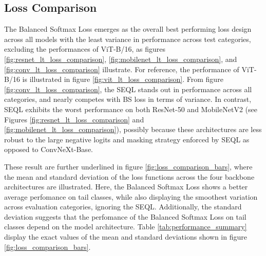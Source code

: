\subsection{Loss Comparison}
The Balanced Softmax Loss emerges as the overall best performing loss design across all models with the least variance in performance across test categories, excluding the performances of ViT-B/16, as figures \ref{fig:resnet_lt_loss_comparison}, \ref{fig:mobilenet_lt_loss_comparison}, and \ref{fig:conv_lt_loss_comparison} illustrate. For reference, the performance of ViT-B/16 is illustrated in figure \ref{fig:vit_lt_loss_comparison}. From figure \ref{fig:conv_lt_loss_comparison}, the SEQL stands out in performance across all categories, and nearly competes with BS loss in terms of variance. In contrast, SEQL exhibits the worst performance on both ResNet-50 and MobileNetV2 (see Figures \ref{fig:resnet_lt_loss_comparison} and \ref{fig:mobilenet_lt_loss_comparison}), possibly because these architectures are less robust to the large negative logits and masking strategy enforced by SEQL as opposed to ConvNeXt-Base.

These result are further underlined in figure \ref{fig:loss_comparison_bars}, where the mean and standard deviation of the loss functions across the four backbone architectures are illustrated. Here, the Balanced Softmax Loss shows a better average perfomance on tail classes, while also displaying the smoothest variation across evaluation categories, ignoring the SEQL. Additionally, the standard deviation suggests that the perfomance of the Balanced Softmax Loss on tail classes depend on the model architecture. Table \ref{tab:performance_summary} display the exact values of the mean and standard deviations shown in figure \ref{fig:loss_comparison_bars}. 


